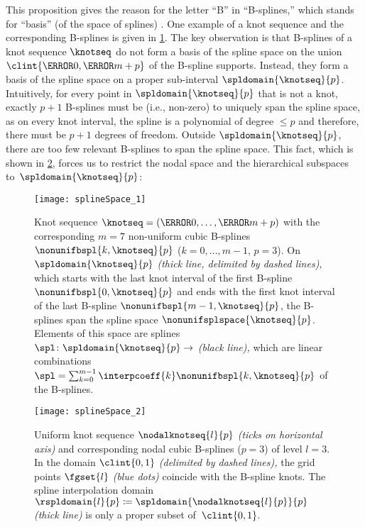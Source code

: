 This proposition gives the reason for the letter ``B'' in ``B-splines,''
which stands for ``basis'' (of the space of splines) \cite{Schoenberg67Spline}.
One example of a knot sequence and the corresponding B-splines is
given in \cref{fig:splineSpaceGeneral}.
The key observation is that B-splines of a knot sequence $\knotseq$
do not form a basis of the spline space on the union
$\clint{\knot{0}, \knot{m+p}}$ of the B-spline supports.
Instead, they form a basis of the spline space
on a proper sub-interval $\spldomain{\knotseq}{p}$.
Intuitively, for every point in $\spldomain{\knotseq}{p}$ that is not a knot,
exactly $p + 1$ B-splines must be  (i.e., non-zero)
to uniquely span the spline space,
as on every knot interval, the spline is a polynomial of degree $\le p$
and therefore, there must be $p + 1$ degrees of freedom.
Outside $\spldomain{\knotseq}{p}$, there are too few relevant B-splines
to span the spline space.
This fact,
which is shown in \cref{fig:splineSpaceUniform},
forces us to restrict the nodal space and the hierarchical subspaces
to~$\spldomain{\knotseq}{p}$:

\begin{figure}
  \texttt{[image: splineSpace\_1]}%
  \caption[%
    Non-uniform B-splines with knot sequence and interpolation domain%
  ]{%
    Knot sequence $\knotseq = (\knot{0}, \dotsc, \knot{m+p})$
    with the corresponding $m = 7$ non-uniform cubic B-splines
    $\nonunifbspl{k,\knotseq}{p}$ ($k = 0, \dotsc, m - 1$, $p = 3$).
    On $\spldomain{\knotseq}{p}$ \emph{(thick line, delimited by dashed lines),}
    which starts with the last knot interval of the first B-spline
    $\nonunifbspl{0,\knotseq}{p}$
    and ends with the first knot interval of the last B-spline
    $\nonunifbspl{m-1,\knotseq}{p}$,
    the B-splines span the spline space $\nonunifsplspace{\knotseq}{p}$.
    Elements of this space are splines $\spl\colon \spldomain{\knotseq}{p} \to \real$
    \emph{(black line),}
    which are linear combinations
    $\spl = \sum_{k=0}^{m-1} \interpcoeff{k} \nonunifbspl{k,\knotseq}{p}$
    of the B-splines.%
  }%
  \label{fig:splineSpaceGeneral}%
\end{figure}

\begin{figure}
  \texttt{[image: splineSpace\_2]}%
  \caption[%
    Uniform nodal B-splines and knot sequence%
  ]{%
    Uniform knot sequence $\nodalknotseq{l}{p}$ \emph{(ticks on horizontal axis)}
    and corresponding nodal cubic B-splines ($p = 3$) of level $l = 3$.
    In the domain $\clint{0, 1}$ \emph{(delimited by dashed lines),}
    the grid points $\fgset{l}$ \emph{\textcolor{mittelblau}{(blue dots)}}
    coincide with the B-spline knots.
    The spline interpolation domain
    $\rspldomain{l}{p} \ceq \spldomain{\nodalknotseq{l}{p}}{p}$
    \emph{(thick line)}
    is only a proper subset of~$\clint{0, 1}$.%
  }%
  \label{fig:splineSpaceUniform}%
\end{figure}

